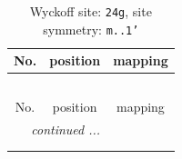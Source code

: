 \documentclass[fleqn,8pt]{jsarticle}
\begin{document}
\renewcommand{\arraystretch}{1.2}
\begin{longtable}{ccc}
\caption{Wyckoff site: {\tt 24g}, site symmetry: {\tt m..1'}}
 \\
 \hline \hline
No. & position & mapping \\ \hline \endfirsthead

\multicolumn{2}{l}{\tablename\ \thetable{}} \\
 \hline \hline
No. & position & mapping \\ \hline \endhead

 \hline \hline
\multicolumn{2}{r}{\footnotesize\it continued ...} \\ \endfoot

 \hline \hline
\multicolumn{2}{r}{} \\ \endlastfoot


\end{longtable}
\end{document}
